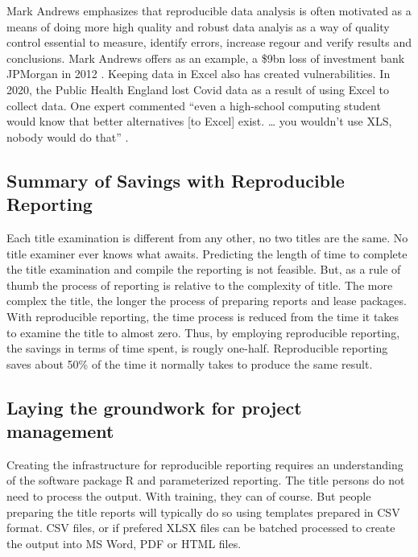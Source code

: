 \documentclass[
]{book}
\theoremstyle{definition}
\theoremstyle{definition}
\theoremstyle{definition}
\theoremstyle{definition}
\theoremstyle{remark}
\begin{document}
Mark Andrews \citep{andrewsChapterReproducibleData} emphasizes that reproducible data analysis is often motivated as a means of doing more high quality and robust data analyis as a way of quality control essential to measure, identify errors, increase regour and verify results and conclusions. Mark Andrews offers as an example, a \$9bn loss of investment bank JPMorgan in 2012 \citep{ExcelMostDangerous2021}. Keeping data in Excel also has created vulnerabilities. In 2020, the Public Health England lost Covid data as a result of using Excel to collect data. One expert commented ``even a high-school computing student would know that better alternatives {[}to Excel{]} exist. \ldots{} you wouldn't use XLS, nobody would do that'' \citep{ExcelWhyUsing2020}.

\hypertarget{summary-of-savings-with-reproducible-reporting}{%
\subsection{Summary of Savings with Reproducible Reporting}\label{summary-of-savings-with-reproducible-reporting}}

Each title examination is different from any other, no two titles are the same. No title examiner ever knows what awaits. Predicting the length of time to complete the title examination and compile the reporting is not feasible. But, as a rule of thumb the process of reporting is relative to the complexity of title. The more complex the title, the longer the process of preparing reports and lease packages. With reproducible reporting, the time process is reduced from the time it takes to examine the title to almost zero. Thus, by employing reproducible reporting, the savings in terms of time spent, is rougly one-half. Reproducible reporting saves about 50\% of the time it normally takes to produce the same result.

\hypertarget{laying-the-groundwork-for-project-management}{%
\subsection{Laying the groundwork for project management}\label{laying-the-groundwork-for-project-management}}

Creating the infrastructure for reproducible reporting requires an understanding of the software package R and parameterized reporting. The title persons do not need to process the output. With training, they can of course. But people preparing the title reports will typically do so using templates prepared in CSV format. CSV files, or if prefered XLSX files can be batched processed to create the output into MS Word, PDF or HTML files.
\end{document}
